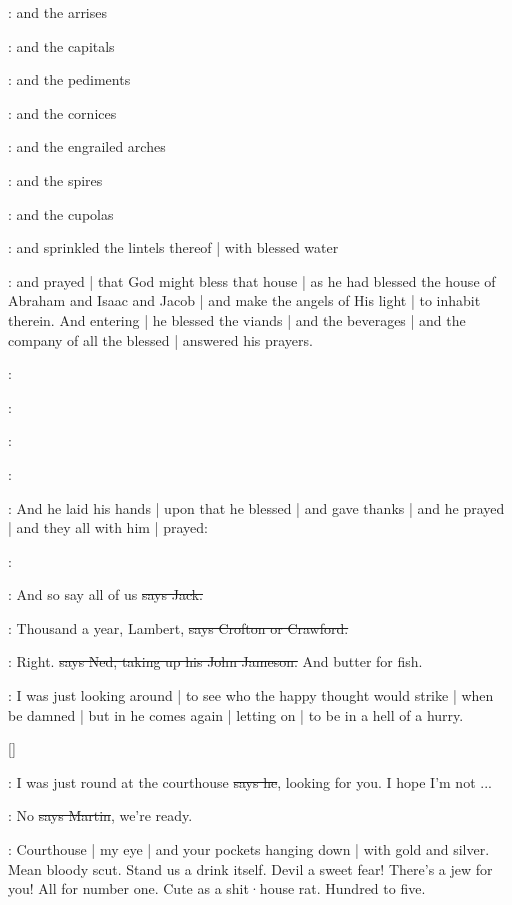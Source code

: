 :
and the arrises

:
and the capitals

:
and the pediments

:
and the cornices

:
and the engrailed arches

:
and the spires

:
and the cupolas

:
and sprinkled the lintels thereof |
with blessed water

:
and prayed |
that God might bless that house |
as he had blessed the house of Abraham and Isaac and Jacob |
and make the angels of His light |
to inhabit therein.
And entering |
he blessed the viands |
and the beverages |
and the company of all the blessed |
answered his prayers.

:

:

:

:

:
And he laid his hands |
upon that he blessed |
and gave thanks |
and he prayed |
and they all with him |
prayed:

\All:

\power:
And so say all of us
\sout{says Jack.}

\crofton:
Thousand a year,
Lambert,
\sout{says Crofton or Crawford.}

\lambert:
Right.
\sout{says Ned,
taking up his John Jameson.}
And butter for fish.

\Nq:
I was just looking around |
to see who the happy thought would strike |
when be damned |
but in he comes again |
letting on |
to be in a hell of a hurry.

[]

\Bloom:
I was just round at the courthouse
\sout{says he},
looking for you.
I hope I'm not ...

\cunningham:
No
\sout{says Martin},
we're ready.

\Nq:
Courthouse |
my eye |
and your pockets hanging down |
with gold and silver.
Mean bloody scut.
Stand us a drink itself.
Devil a sweet fear!
There's a jew for you!
All for number one.
Cute as a shit·house rat.
Hundred to five.

